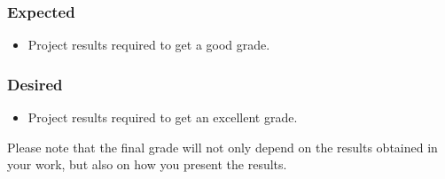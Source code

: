 \documentclass[rnd]{mas_proposal}
\begin{document}
\subsubsection*{Expected}
\begin{itemize}
    \item Project results required to get a good grade.
\end{itemize}

\subsubsection*{Desired}
\begin{itemize}
    \item Project results required to get an excellent grade.
\end{itemize}

Please note that the final grade will not only depend on the results obtained in your work, but also on how you present the results.

\nocite{*}

\end{document}
